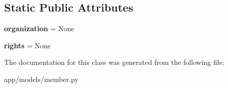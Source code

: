 \subsection*{Static Public Attributes}
\begin{DoxyCompactItemize}
\item 
\mbox{\label{classapp_1_1models_1_1member_1_1_member_af0d53a0e9e8e3d3acc5b00ac075234d9}} 
{\bfseries organization} = None
\item 
\mbox{\label{classapp_1_1models_1_1member_1_1_member_a4622492e10ea9e9b9fa4ff9bad323ff0}} 
{\bfseries rights} = None
\end{DoxyCompactItemize}


The documentation for this class was generated from the following file\+:\begin{DoxyCompactItemize}
\item 
app/models/member.\+py\end{DoxyCompactItemize}
